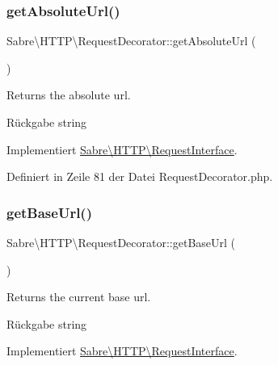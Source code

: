 \subsubsection{\texorpdfstring{get\+Absolute\+Url()}{getAbsoluteUrl()}}
{\footnotesize\ttfamily Sabre\textbackslash{}\+H\+T\+T\+P\textbackslash{}\+Request\+Decorator\+::get\+Absolute\+Url (\begin{DoxyParamCaption}{ }\end{DoxyParamCaption})}

Returns the absolute url.

\begin{DoxyReturn}{Rückgabe}
string 
\end{DoxyReturn}


Implementiert \mbox{\hyperlink{interface_sabre_1_1_h_t_t_p_1_1_request_interface_a8c8267e6a7d901a0f63f66a2ecc59a91}{Sabre\textbackslash{}\+H\+T\+T\+P\textbackslash{}\+Request\+Interface}}.



Definiert in Zeile 81 der Datei Request\+Decorator.\+php.

\mbox{\label{class_sabre_1_1_h_t_t_p_1_1_request_decorator_ae083a7f3c8138b06e8beae5dfca6fd92}} 
\subsubsection{\texorpdfstring{get\+Base\+Url()}{getBaseUrl()}}
{\footnotesize\ttfamily Sabre\textbackslash{}\+H\+T\+T\+P\textbackslash{}\+Request\+Decorator\+::get\+Base\+Url (\begin{DoxyParamCaption}{ }\end{DoxyParamCaption})}

Returns the current base url.

\begin{DoxyReturn}{Rückgabe}
string 
\end{DoxyReturn}


Implementiert \mbox{\hyperlink{interface_sabre_1_1_h_t_t_p_1_1_request_interface_af5683bbd6dfff74d91ac4620ae328feb}{Sabre\textbackslash{}\+H\+T\+T\+P\textbackslash{}\+Request\+Interface}}.



